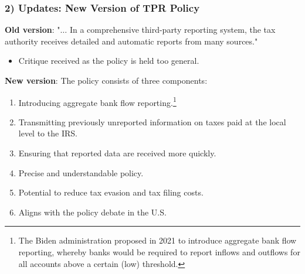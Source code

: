 \documentclass{beamer}
\begin{document}
\begin{frame}
\frametitle{2) Updates: New Version of TPR Policy}
\label{Update2}
\textbf{Old version}: "$\dots$ In a comprehensive third-party reporting system, the tax authority receives detailed and automatic reports from many sources."
\begin{itemize}
    \item[$\rightarrow$] \alert{Critique received as the policy is held too general.}
\end{itemize}
\vspace{1em}

\textbf{New version}: The policy consists of three components:
\begin{enumerate}
    \item Introducing aggregate bank flow reporting.\footnote[4]{The Biden administration proposed in 2021 to introduce aggregate bank flow reporting, whereby banks would be required to report inflows and outflows for all accounts above a certain (low) threshold.} 
    \item Transmitting previously unreported information on taxes paid at the local level to the IRS.
    \item Ensuring that reported data are received more quickly.
    \vspace{0.5em}
    \item[$\rightarrow$] \alert{Precise and understandable policy.}
    \item[$\rightarrow$] \alert{Potential to reduce tax evasion and tax filing costs.}
    \item[$\rightarrow$] \alert{Aligns with the policy debate in the U.S.} \hfill \hyperlink{DetailedPolicies}{}
\end{enumerate}

\end{frame}
\end{document}
